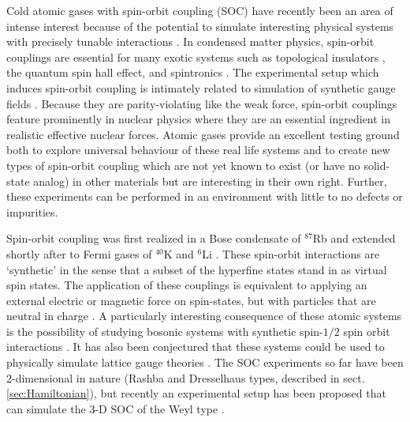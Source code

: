 \documentclass[%
 preprint,
 amsmath,amssymb,
 aps,
]{revtex4-1}
\begin{document}
Cold atomic gases with spin-orbit coupling (SOC) have recently been an area of intense interest because of the potential to simulate interesting physical systems with precisely tunable interactions \cite{nature11841}. In condensed matter physics, spin-orbit couplings are essential for many exotic systems such as topological insulators \cite{das2013engineering,PhysRevLett.105.255302}, the quantum spin hall effect\cite{nature12185}, and spintronics \cite{RevModPhys.76.323}. The experimental setup which induces spin-orbit coupling is intimately related to simulation of synthetic gauge fields \cite{RevModPhys.83.1523,hamner2014dicke,Lin:2009zzb,Bermudez:2011db}. Because they are parity-violating like the weak force, spin-orbit couplings feature prominently in nuclear physics where they are an essential ingredient in realistic effective nuclear forces. Atomic gases provide an excellent testing ground both to explore universal behaviour of these real life systems and to create new types of spin-orbit coupling which are not yet known to exist (or have no solid-state analog) in other materials but are interesting in their own right. Further, these experiments can be performed in an environment with little to no defects or impurities.

Spin-orbit coupling was first realized in a Bose condensate of $^{87}$Rb \cite{nature09887} and extended shortly after to Fermi gases of $^{40}$K \cite{PhysRevLett.109.095301} and $^6$Li \cite{PhysRevLett.109.095302}. These spin-orbit interactions are `synthetic' in the sense that a subset of the hyperfine states stand in as virtual spin states.   The application of these couplings is equivalent to applying an external electric or magnetic force on spin-states, but with particles that are neutral in charge \cite{Lin:2011,PhysRevLett.107.255301}.  A particularly interesting consequence of these atomic systems is the possibility of studying bosonic systems with synthetic spin-$1/2$ spin orbit interactions \cite{PhysRevA.68.063612,nature09887}.   It has also been conjectured that these systems could be used to physically simulate lattice gauge theories \cite{Bermudez:2010da,Mazza:2011kf}.  The SOC experiments so far have been 2-dimensional in nature (Rashba and Dresselhaus types, described in sect.\ref{sec:Hamiltonian}), but recently an experimental setup has been proposed that can simulate the 3-D SOC of the Weyl type \cite{PhysRevLett.108.235301}.
\end{document}
